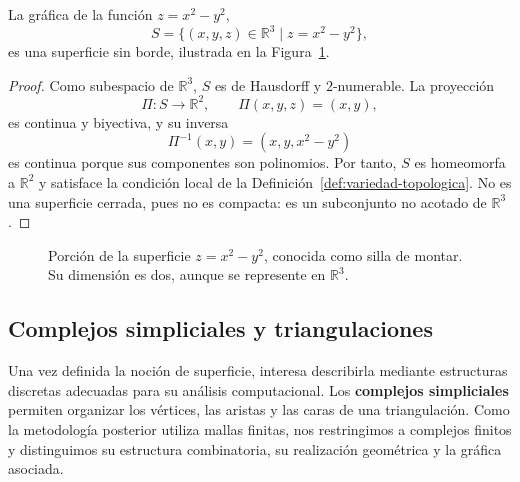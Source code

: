\begin{example}
La gráfica de la función $z=x^2-y^2$,
\[
S=\{(x,y,z)\in\mathbb{R}^3\mid z=x^2-y^2\},
\]
es una superficie sin borde, ilustrada en la Figura~\ref{fig:silla}.

\begin{proof}
Como subespacio de $\mathbb{R}^3$, $S$ es de Hausdorff y $2$-numerable. La proyección
\[
\Pi:S\longrightarrow\mathbb{R}^2,\qquad \Pi(x,y,z)=(x,y),
\]
es continua y biyectiva, y su inversa
\[
\Pi^{-1}(x,y)=(x,y,x^2-y^2)
\]
es continua porque sus componentes son polinomios. Por tanto, $S$ es homeomorfa a $\mathbb{R}^2$ y satisface la condición local de la Definición~\ref{def:variedad-topologica}. No es una superficie cerrada, pues no es compacta: es un subconjunto no acotado de $\mathbb{R}^3$.
\end{proof}

\begin{figure}[ht]
	\centering
    \caption{Porción de la superficie $z=x^2-y^2$, conocida como silla de montar. Su dimensión es dos, aunque se represente en $\mathbb{R}^3$.}
    \label{fig:silla}
\end{figure}


\end{example}

\subsection{Complejos simpliciales y triangulaciones}
Una vez definida la noción de superficie, interesa describirla mediante estructuras discretas adecuadas para su análisis computacional. Los \textbf{complejos simpliciales} permiten organizar los vértices, las aristas y las caras de una triangulación. Como la metodología posterior utiliza mallas finitas, nos restringimos a complejos finitos y distinguimos su estructura combinatoria, su realización geométrica y la gráfica asociada.

